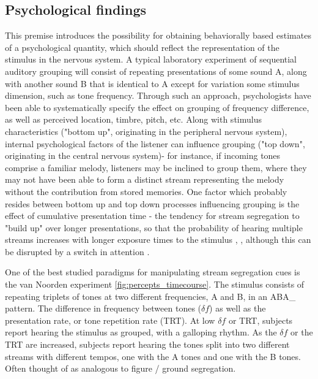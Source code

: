 \subsection{Psychological findings}
This premise introduces the possibility for obtaining behaviorally based estimates of a psychological quantity, which should reflect the representation of the stimulus in the nervous system. A typical laboratory experiment of sequential auditory grouping will consist of repeating presentations of some sound A, along with another sound B that is identical to A except for variation some stimulus dimension, such as tone frequency. Through such an approach, psychologists have been able to systematically specify the effect on grouping of frequency difference, as well as perceived location, timbre, pitch, etc. Along with stimulus characteristics ("bottom up", originating in the peripheral nervous system), internal psychological factors of the listener can influence grouping ("top down", originating in the central nervous system)- for instance, if incoming tones comprise a familiar melody, listeners may be inclined to group them, where they may not have been able to form a distinct stream representing the melody without the contribution from stored memories. One factor which probably resides between bottom up and top down processes influencing grouping is the effect of cumulative presentation time - the tendency for stream segregation to "build up" over longer presentations, so that the probability of hearing multiple streams increases with longer exposure times to the stimulus \cite{Bregman1978}, \cite{Anstis1985}, although this can be disrupted by a switch in attention \cite{Cusack2004}.

One of the best studied paradigms for manipulating stream segregation cues is the van Noorden \cite{Noorden1975} experiment \ref{fig:percepts_timecourse}. The stimulus consists of repeating triplets of tones at two different frequencies, A and B, in an ABA\_ pattern. The difference in frequency between tones ($\delta f$) as well as the presentation rate, or tone repetition rate (TRT). At low $\delta f$ or TRT, subjects report hearing the stimulus as grouped, with a galloping rhythm. As the $\delta f$ or the TRT are increased, subjects report hearing the tones split into two different streams with different tempos, one with the A tones and one with the B tones. Often thought of as analogous to figure / ground segregation.

